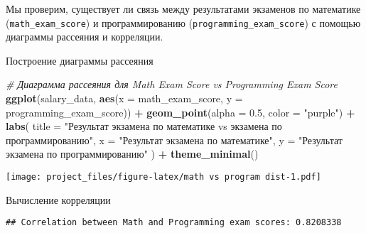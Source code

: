 \documentclass[
]{article}
\newenvironment{Shaded}{\begin{snugshade}}{\end{snugshade}}
\newcommand{\AttributeTok}[1]{\textcolor[rgb]{0.13,0.29,0.53}{#1}}
\newcommand{\CommentTok}[1]{\textcolor[rgb]{0.56,0.35,0.01}{\textit{#1}}}
\newcommand{\FloatTok}[1]{\textcolor[rgb]{0.00,0.00,0.81}{#1}}
\newcommand{\FunctionTok}[1]{\textcolor[rgb]{0.13,0.29,0.53}{\textbf{#1}}}
\newcommand{\NormalTok}[1]{#1}
\newcommand{\OtherTok}[1]{\textcolor[rgb]{0.56,0.35,0.01}{#1}}
\newcommand{\SpecialCharTok}[1]{\textcolor[rgb]{0.81,0.36,0.00}{\textbf{#1}}}
\newcommand{\StringTok}[1]{\textcolor[rgb]{0.31,0.60,0.02}{#1}}
\begin{document}
Мы проверим, существует ли связь между результатами экзаменов по
математике (\texttt{math\_exam\_score}) и программированию
(\texttt{programming\_exam\_score}) с помощью диаграммы рассеяния и
корреляции.

Построение диаграммы рассеяния

\begin{Shaded}
\begin{Highlighting}[]
\CommentTok{\# Диаграмма рассеяния для Math Exam Score vs Programming Exam Score}
\FunctionTok{ggplot}\NormalTok{(salary\_data, }\FunctionTok{aes}\NormalTok{(}\AttributeTok{x =}\NormalTok{ math\_exam\_score, }\AttributeTok{y =}\NormalTok{ programming\_exam\_score)) }\SpecialCharTok{+}
  \FunctionTok{geom\_point}\NormalTok{(}\AttributeTok{alpha =} \FloatTok{0.5}\NormalTok{, }\AttributeTok{color =} \StringTok{"purple"}\NormalTok{) }\SpecialCharTok{+}
  \FunctionTok{labs}\NormalTok{(}
    \AttributeTok{title =} \StringTok{"Результат экзамена по математике vs экзамена по программированию"}\NormalTok{,}
    \AttributeTok{x =} \StringTok{"Результат экзамена по математике"}\NormalTok{,}
    \AttributeTok{y =} \StringTok{"Результат экзамена по программированию"}
\NormalTok{  ) }\SpecialCharTok{+}
  \FunctionTok{theme\_minimal}\NormalTok{()}
\end{Highlighting}
\end{Shaded}

\texttt{[image: project\_files/figure-latex/math vs program dist-1.pdf]}

Вычисление корреляции

\begin{Shaded}
\end{Shaded}

\begin{verbatim}
## Correlation between Math and Programming exam scores: 0.8208338
\end{verbatim}
\end{document}
